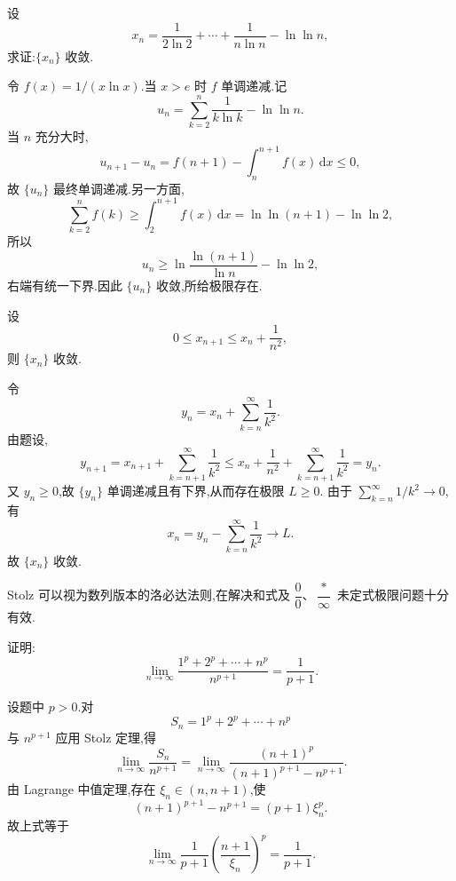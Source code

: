 \begin{example}
  设
  \[
    x_n=\dfrac{1}{2\ln2}+\cdots+\dfrac{1}{n\ln n}-\ln\ln n,
  \]
  求证:$\{x_n\}$ 收敛.
\end{example}
\exampleblank

\begin{solution}
  令 $f(x)=1/(x\ln x)$.当 $x>e$ 时 $f$ 单调递减.记
  \[
    u_n=\sum\limits_{k=2}^n\dfrac{1}{k\ln k}-\ln\ln n.
  \]
  当 $n$ 充分大时,
  \[
    u_{n+1}-u_n
    =f(n+1)-\int_n^{n+1}f(x)\,\mathrm{d}x\leq0,
  \]
  故 $\{u_n\}$ 最终单调递减.另一方面,
  \[
    \sum\limits_{k=2}^n f(k)
    \geq\int_2^{n+1}f(x)\,\mathrm{d}x
    =\ln\ln(n+1)-\ln\ln2,
  \]
  所以
  \[
    u_n\geq\ln\dfrac{\ln(n+1)}{\ln n}-\ln\ln2,
  \]
  右端有统一下界.因此 $\{u_n\}$ 收敛,所给极限存在.
\end{solution}

\begin{example}
  设
  \[
    0\leq x_{n+1}\leq x_n+\dfrac{1}{n^2},
  \]
  则 $\{x_n\}$ 收敛.
\end{example}
\exampleblank

\begin{solution}
  令
  \[
    y_n=x_n+\sum\limits_{k=n}^{\infty}\dfrac{1}{k^2}.
  \]
  由题设,
  \[
    y_{n+1}
    =x_{n+1}+\sum\limits_{k=n+1}^{\infty}\dfrac{1}{k^2}
    \leq x_n+\dfrac{1}{n^2}+\sum\limits_{k=n+1}^{\infty}\dfrac{1}{k^2}
    =y_n.
  \]
  又 $y_n\geq0$,故 $\{y_n\}$ 单调递减且有下界,从而存在极限 $L\geq0$.
  由于 $\displaystyle \sum\limits_{k=n}^{\infty}1/k^2\to0$,有
  \[
    x_n=y_n-\sum\limits_{k=n}^{\infty}\dfrac{1}{k^2}\longrightarrow L.
  \]
  故 $\{x_n\}$ 收敛.
\end{solution}




Stolz 可以视为数列版本的洛必达法则,在解决和式及 $\dfrac{0}{0}$、$\dfrac{*}{\infty}$ 未定式极限问题十分有效.

\begin{example}
  证明:
  \[
    \lim\limits_{n\to\infty}
    \dfrac{1^p+2^p+\cdots+n^p}{n^{p+1}}
    =\dfrac{1}{p+1}.
  \]
\end{example}
\exampleblank

\begin{solution}
  设题中 $p>0$.对
  \[
    S_n=1^p+2^p+\cdots+n^p
  \]
  与 $n^{p+1}$ 应用 Stolz 定理,得
  \[
    \lim\limits_{n\to\infty}\dfrac{S_n}{n^{p+1}}
    =\lim\limits_{n\to\infty}
    \dfrac{(n+1)^p}{(n+1)^{p+1}-n^{p+1}}.
  \]
  由 Lagrange 中值定理,存在 $\xi_n\in(n,n+1)$,使
  \[
    (n+1)^{p+1}-n^{p+1}=(p+1)\xi_n^p.
  \]
  故上式等于
  \[
    \lim\limits_{n\to\infty}\dfrac{1}{p+1}\left(\dfrac{n+1}{\xi_n}\right)^p
    =\dfrac{1}{p+1}.
  \]
\end{solution}


